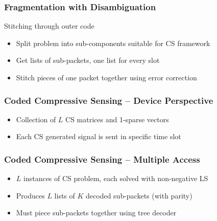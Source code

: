 
\begin{frame}
\frametitle{Fragmentation with Disambiguation}
\begin{center}

\end{center}
\vfill
\begin{block}{Stitching through outer code}
\begin{itemize}
\item Split problem into sub-components suitable for CS framework
\item Get lists of sub-packets, one list for every slot
\item Stitch pieces of one packet together using error correction
\end{itemize}
\end{block}
\end{frame}


\begin{frame}
\frametitle{Coded Compressive Sensing -- Device Perspective}
\begin{center}

\end{center}
\begin{itemize}
\item Collection of $L$ CS matrices and 1-sparse vectors
\item Each CS generated signal is sent in specific time slot
\end{itemize}
\end{frame}


\begin{frame}
\frametitle{Coded Compressive Sensing -- Multiple Access}
\begin{center}

\end{center}
\begin{itemize}
\item $L$ instances of CS problem, each solved with non-negative LS
\item Produces $L$ lists of $K$ decoded sub-packets (with parity)
\item Must piece sub-packets together using tree decoder
\end{itemize}
\end{frame}

